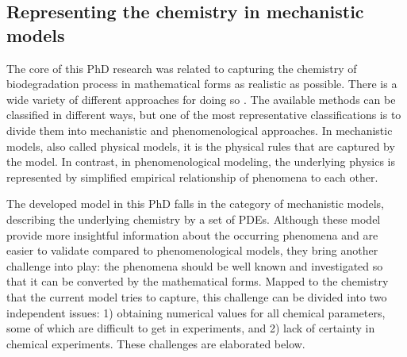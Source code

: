 \subsection{Representing the chemistry in mechanistic models}


The core of this PhD research was related to capturing the chemistry of biodegradation process in mathematical forms as realistic as possible. There is a wide variety of different approaches for doing so \cite{Abdalla2020}. The available methods can be classified in different ways, but one of the most representative classifications is to divide them into mechanistic and phenomenological approaches. In mechanistic models, also called physical models, it is the physical rules that are captured by the model. In contrast, in phenomenological modeling, the underlying physics is represented by simplified empirical relationship of phenomena to each other. 

The developed model in this PhD falls in the category of mechanistic models, describing the underlying chemistry by a set of PDEs. Although these model provide more insightful information about the occurring phenomena and are easier to validate compared to phenomenological models, they bring another challenge into play: the phenomena should be well known and investigated so that it can be converted by the mathematical forms. Mapped to the chemistry that the current model tries to capture, this challenge can be divided into two independent issues: 1) obtaining numerical values for all chemical parameters, some of which are difficult to get in experiments, and 2) lack of certainty in chemical experiments. These challenges are elaborated below.

